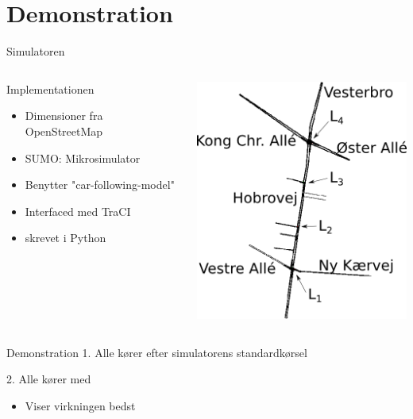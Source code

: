 \section{Demonstration}
\begin{frame}{Simulatoren}
\begin{columns}
\begin{column}{0.6\textwidth}
Implementationen
\begin{itemize}
\item Dimensioner fra OpenStreetMap
\item SUMO: Mikrosimulator
\item Benytter "car-following-model"
\item Interfaced med TraCI
\item \tech skrevet i Python
\end{itemize}
\end{column}

\begin{column}{0.5\textwidth}
\includegraphics[width=1\textwidth]{../images/HobrovejNy.png}
\end{column}
\end{columns}
\end{frame}

\begin{frame}{Demonstration}
1. Alle kører efter simulatorens standardkørsel
\vspace{4mm}

2. Alle kører med \tech
\begin{itemize}
\item Viser virkningen bedst
\end{itemize}
\end{frame}
